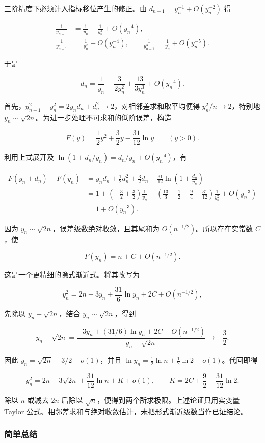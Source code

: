 \documentclass[11pt,a4paper]{article}
\begin{document}
三阶精度下必须计入指标移位产生的修正。由
\(d_{n-1}=y_n^{-1}+O(y_n^{-2})\) 得

\[
\begin{aligned}
\frac1{y_{n-1}}&=\frac1{y_n}+\frac1{y_n^3}+O(y_n^{-4}),\\
\frac1{y_{n-1}^2}&=\frac1{y_n^2}+O(y_n^{-4}),\qquad
\frac1{y_{n-1}^3}=\frac1{y_n^3}+O(y_n^{-5}).
\end{aligned}
\]

于是

\[
d_n=\frac1{y_n}-\frac3{2y_n^2}+\frac{13}{3y_n^3}+O(y_n^{-4}).
\]

首先，\(y_{n+1}^2-y_n^2=2y_nd_n+d_n^2\to2\)，对相邻差求和取平均便得
\(y_n^2/n\to2\)，特别地
\(y_n\sim\sqrt{2n}\)。为进一步处理不可求和的低阶误差，构造

\[
F(y)=\frac12y^2+\frac32y-\frac{31}{12}\ln y\qquad(y>0).
\]

利用上式展开及 \(\ln(1+d_n/y_n)=d_n/y_n+O(y_n^{-4})\)，有

\[
\begin{aligned}
F(y_n+d_n)-F(y_n)
&=y_nd_n+\frac12d_n^2+\frac32d_n
-\frac{31}{12}\ln\left(1+\frac{d_n}{y_n}\right)\\
&=1+\left(-\frac32+\frac32\right)\frac1{y_n}
+\left(\frac{13}{3}+\frac12-\frac94-\frac{31}{12}\right)\frac1{y_n^2}
+O(y_n^{-3})\\
&=1+O(y_n^{-3}).
\end{aligned}
\]

因为 \(y_n\sim\sqrt{2n}\)，误差级数绝对收敛，且其尾和为
\(O(n^{-1/2})\)。所以存在实常数 \(C\)，使

\[
F(y_n)=n+C+O(n^{-1/2}).
\]

这是一个更精细的隐式渐近式。将其改写为

\[
y_n^2=2n-3y_n+\frac{31}{6}\ln y_n+2C+O(n^{-1/2}),
\]

先除以 \(y_n+\sqrt{2n}\)，结合 \(y_n\sim\sqrt{2n}\)，得到

\[
y_n-\sqrt{2n}
=\frac{-3y_n+(31/6)\ln y_n+2C+O(n^{-1/2})}{y_n+\sqrt{2n}}
\longrightarrow-\frac32.
\]

因此 \(y_n=\sqrt{2n}-3/2+o(1)\)，并且
\(\ln y_n=\tfrac12\ln n+\tfrac12\ln2+o(1)\)。代回即得

\[
y_n^2=2n-3\sqrt{2n}+\frac{31}{12}\ln n+K+o(1),
\qquad K=2C+\frac92+\frac{31}{12}\ln2.
\]

除以 \(n\) 或减去 \(2n\) 后除以
\(\sqrt n\)，便得到两个所求极限。上述论证只用实变量 Taylor
公式、相邻差求和与绝对收敛估计，未把形式渐近级数当作已证结论。

\subsubsection{简单总结}\label{ux7b80ux5355ux603bux7ed3-9}
\end{document}
